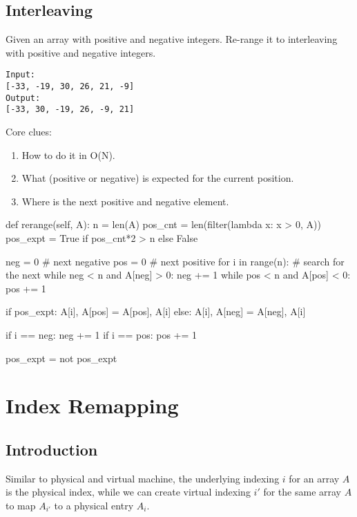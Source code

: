 \subsection{Interleaving}
 Given an array with positive and negative integers. Re-range it to interleaving with positive and negative integers.
\begin{lstlisting}
Input:
[-33, -19, 30, 26, 21, -9]
Output:
[-33, 30, -19, 26, -9, 21]
\end{lstlisting}
Core clues:
\begin{enumerate}
\item How to do it in O(N).
\item What (positive or negative) is expected for the current position.
\item Where is the next positive and negative element.
\end{enumerate}
\begin{python}
def rerange(self, A):
    n = len(A)
    pos_cnt = len(filter(lambda x: x > 0, A))
    pos_expt = True if pos_cnt*2 > n else False

    neg = 0  # next negative
    pos = 0  # next positive
    for i in range(n):
        # search for the next 
        while neg < n and A[neg] > 0: neg += 1
        while pos < n and A[pos] < 0: pos += 1
        
        if pos_expt:
            A[i], A[pos] = A[pos], A[i]
        else:
            A[i], A[neg] = A[neg], A[i]

        if i == neg: neg += 1
        if i == pos: pos += 1

        pos_expt = not pos_expt
\end{python}

\section{Index Remapping}
\subsection{Introduction}
 Similar to physical and virtual machine, the underlying indexing $i$ for an array $A$ is the physical index, while we can create virtual indexing $i'$ for the same array $A$ to map $A_{i'}$ to a physical entry $A_{i}$.
